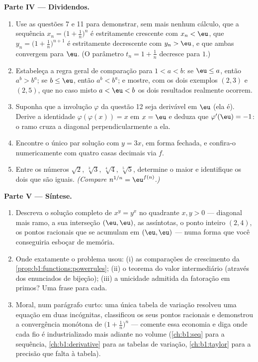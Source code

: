 \begin{problem}
\medskip
\noindent\textbf{Parte IV --- Dividendos.}
\begin{enumerate}
  \item Use as questões 7 e 11 para demonstrar, sem mais
        nenhum cálculo, que a sequência $x_n = \bigl(1 +
        \frac1n\bigr)^n$ é estritamente crescente com $x_n < \eu$,
        que $y_n = \bigl(1 + \frac1n\bigr)^{n+1}$ é estritamente
        decrescente com $y_n > \eu$, e que ambas convergem para
        $\eu$. (O parâmetro $t_n = 1 + \frac1n$ decresce para
        $1$.)
  \item Estabeleça a regra geral de comparação para $1 < a < b$:
        se $\eu \leq a$, então $a^b > b^a$; se $b \leq \eu$, então
        $a^b < b^a$; e mostre, com os dois exemplos $(2, 3)$ e
        $(2, 5)$, que no caso misto $a < \eu < b$ os dois
        resultados realmente ocorrem.
  \item Suponha que a involução $\varphi$ da questão 12 seja
        derivável em $\eu$ (ela é). Derive a
        identidade $\varphi(\varphi(x)) = x$ em $x = \eu$ e deduza que
        $\varphi'(\eu) = -1$: o ramo cruza a diagonal
        perpendicularmente a ela.
  \item Encontre o único par solução com $y = 3x$, em forma
        fechada, e confira-o numericamente com quatro casas decimais
        via $f$.
  \item Entre os números $\sqrt2$, $\sqrt[3]3$, $\sqrt[4]4$,
        $\sqrt[5]5$, determine o maior e identifique os dois
        que são iguais. \emph{(Compare $n^{1/n} =
        \eu^{f(n)}$.)}
\end{enumerate}

\medskip
\noindent\textbf{Parte V --- Síntese.}
\begin{enumerate}
  \item Descreva o  solução completo de $x^y = y^x$ no
        quadrante $x, y > 0$ --- diagonal mais ramo, a sua
        interseção $(\eu, \eu)$, as assíntotas, o ponto inteiro
        $(2, 4)$, os pontos racionais que se acumulam em
        $(\eu, \eu)$ --- numa forma que você conseguiria esboçar de
        memória.
  \item Onde exatamente o problema usou: (i) as comparações de
        crescimento da \cref{prop:b1:functions:powerrules}; (ii)
        o teorema do valor intermediário (através dos enunciados de
        bijeção); (iii) a unicidade admitida da fatoração em
        primos? Uma frase para cada.
  \item Moral, num parágrafo curto: uma única tabela de variação
        resolveu uma equação em duas incógnitas, classificou os seus
        pontos racionais e demonstrou a convergência monótona de
        $\bigl(1 + \frac1n\bigr)^n$ --- comente essa economia
        e diga onde cada fio é industrializado mais adiante no
        volume (\cref{ch:b1:seq} para a sequência,
        \cref{ch:b1:derivative} para as tabelas de variação,
        \cref{ch:b1:taylor} para a precisão que falta à tabela).
\end{enumerate}
\end{problem}
